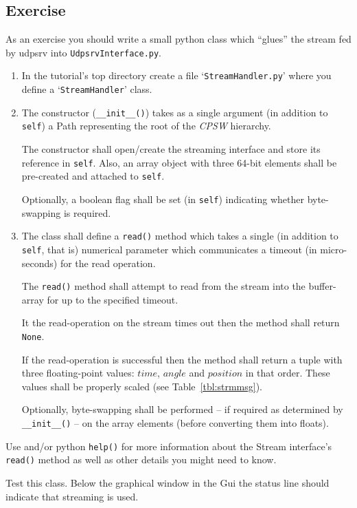 \documentclass[10pt]{article}
\newcommand{\ita}[1]{\emph{#1}}
\newcommand{\cpsw}      {\ita {CPSW}}
\newcommand{\Path}      {{Path}}
\newcommand{\py}        {python}
\newcommand{\udps}      {udpsrv}
\newcommand{\cod}[1] {{\tt#1}}
\begin{document}
\subsection{Exercise}
As an exercise you should write a small \py{} class which ``glues'' the
stream fed by \udps{} into \cod{UdpsrvInterface.py}.
\begin{enumerate}
\item In the tutorial's top directory create a file `\cod{StreamHandler.py}' where you
      define a `\cod{StreamHandler}' class.
\item The constructor (\cod{\_\_init\_\_()}) takes as a single argument (in addition
      to \cod{self}) a \Path{} representing the root of the \cpsw{} hierarchy.

      The constructor shall open/create the streaming interface and store its
      reference in \cod{self}. Also, an array object with three 64-bit elements
      shall be pre-created and attached to \cod{self}.

      Optionally, a boolean flag shall be set (in \cod{self}) indicating whether
      byte-swapping is required.
\item The class shall define a \cod{read()} method which takes a single (in
      addition to \cod{self}, that is) numerical parameter which communicates
      a timeout (in micro-seconds) for the read operation.

      The \cod{read()} method shall attempt to read from the stream into
      the buffer-array for up to the specified timeout.

      It the read-operation on the stream times out then the method
      shall return \cod{None}.

      If the read-operation is successful then the method shall return a tuple with
      three floating-point values: $time$, $angle$ and $position$ in that order. 
      These values shall be properly scaled (see Table~\ref{tbl:strmmsg}).

      Optionally, byte-swapping shall be performed -- if required as determined
      by \cod{\_\_init\_\_()} -- on the array elements (before converting them into
      floats).
\end{enumerate}
Use \cite{userapi} and/or \py{} \cod{help()} for more information about the Stream
interface's \cod{read()} method as well as other details you might need to know.

Test this class. Below the graphical window in the Gui the status line should indicate
that streaming is used.
\end{document}
